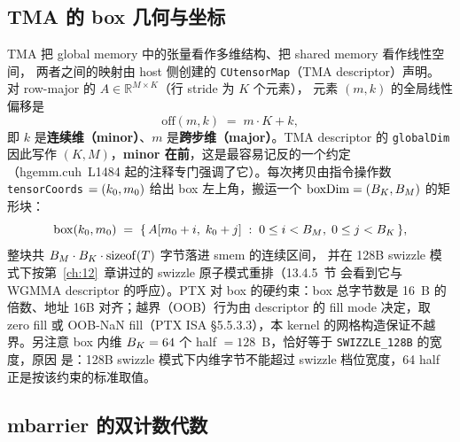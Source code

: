\subsection{TMA 的 box 几何与坐标}

TMA 把 global memory 中的张量看作多维结构、把 shared memory 看作线性空间，
两者之间的映射由 host 侧创建的 \texttt{CUtensorMap}（TMA descriptor）声明。
对 row-major 的 $A \in \mathbb{R}^{M \times K}$（行 stride 为 $K$ 个元素），
元素 $(m, k)$ 的全局线性偏移是
\begin{equation}
  \mathrm{off}(m, k) \;=\; m \cdot K + k ,
  \label{eq:13-gmem-off}
\end{equation}
即 $k$ 是\textbf{连续维（minor）}、$m$ 是\textbf{跨步维（major）}。TMA descriptor 的
\texttt{globalDim} 因此写作 $(K, M)$，\textbf{minor 在前}，这是最容易记反的一个约定
（hgemm.cuh~L1484 起的注释专门强调了它）。每次拷贝由指令操作数
\texttt{tensor\allowbreak{}Coords} $= (k\sb{0}, m\sb{0})$ 给出 box 左上角，搬运一个
$\mathrm{boxDim} = (B\sb{K}, B\sb{M})$ 的矩形块：
\begin{equation}
  \mathrm{box}(k\sb{0}, m\sb{0}) \;=\; \{\, A[m\sb{0}+i,\; k\sb{0}+j] \;:\;
  0 \le i < B\sb{M},\; 0 \le j < B\sb{K} \,\} ,
\end{equation}
整块共 $B\sb{M} \cdot B\sb{K} \cdot \mathrm{sizeof}(T)$ 字节落进 smem 的连续区间，
并在 128B swizzle 模式下按第~\ref{ch:12}~章讲过的 swizzle 原子模式重排（13.4.5~节
会看到它与 WGMMA descriptor 的呼应）。PTX 对 box 的硬约束：box 总字节数是 16~B 的
倍数、地址 16B 对齐；越界（OOB）行为由 descriptor 的 fill mode 决定，取 zero fill
或 OOB-NaN fill（PTX ISA §5.5.3.3），本 kernel 的网格构造保证不越界。另注意 box 内维
$B\sb{K} = 64$ 个 half $= 128$~B，恰好等于 \texttt{SWIZZLE\_\allowbreak{}128\allowbreak{}B} 的宽度，原因
是：128B swizzle 模式下内维字节不能超过 swizzle 档位宽度，64 half 正是按该约束的标准取值。

\subsection{mbarrier 的双计数代数}

